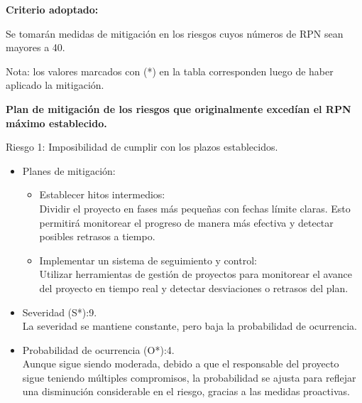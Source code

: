 \textbf{Criterio adoptado:}

Se tomarán medidas de mitigación en los riesgos cuyos números de RPN sean
mayores a 40.

Nota: los valores marcados con (*) en la tabla corresponden luego de haber
aplicado la mitigación.

\textbf{Plan de mitigación de los riesgos que originalmente excedían el RPN máximo
	establecido.}

Riesgo 1: Imposibilidad de cumplir con los plazos establecidos.
\begin{itemize}
	\item Planes de mitigación:\\
	      \begin{itemize}
		      \item Establecer hitos intermedios:\\ Dividir el proyecto en fases más pequeñas con
		            fechas límite claras. Esto permitirá monitorear el progreso de manera más
		            efectiva y detectar posibles retrasos a tiempo.
		      \item Implementar un sistema de seguimiento y control:\\ Utilizar herramientas de
		            gestión de proyectos para monitorear el avance del proyecto en tiempo real y
		            detectar desviaciones o retrasos del plan.
	      \end{itemize}
	\item Severidad (S*):9.\\ La severidad se mantiene constante, pero baja la probabilidad de ocurrencia.
	\item Probabilidad de ocurrencia (O*):4.\\ Aunque sigue siendo moderada, debido a que
	      el responsable del proyecto sigue teniendo múltiples compromisos, la
	      probabilidad se ajusta para reflejar una disminución considerable en el riesgo,
	      gracias a las medidas proactivas.
\end{itemize}

\pagebreak

